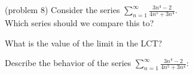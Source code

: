 \documentclass{ximera}
\begin{document}
\begin{problem}(problem 8)
Consider the series $\displaystyle{\sum_{n=1}^\infty \frac{3n^4 -2}{4n^5 + 3n^4}}$.\\
Which series should we compare this to?

\begin{multipleChoice}
\end{multipleChoice}

What is the value of the limit in the LCT?
\begin{multipleChoice}
\end{multipleChoice}

Describe the behavior of the series $\displaystyle{\sum_{n=1}^\infty \frac{3n^4 -2}{4n^5 + 3n^4}:}$
\begin{multipleChoice}
\end{multipleChoice}

\end{problem}
\end{document}
